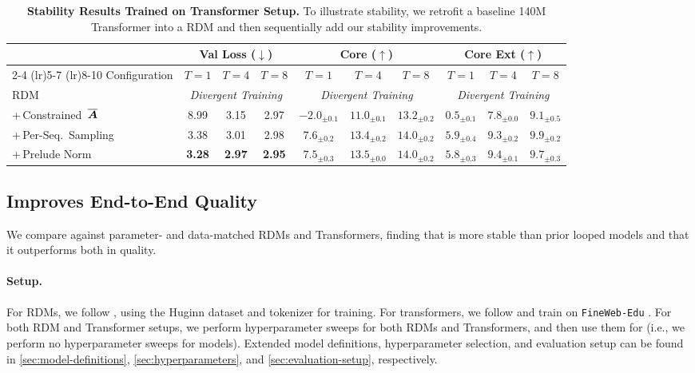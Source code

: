 \begin{table}[!t]
\centering
\small
\setlength{\tabcolsep}{4.5pt}
\begin{tabular}{l ccc ccc ccc}
\toprule
& \multicolumn{3}{c}{Val Loss ($\downarrow$)} & \multicolumn{3}{c}{Core ($\uparrow$)} & \multicolumn{3}{c}{Core Ext ($\uparrow$)} \\
\cmidrule(lr){2-4} \cmidrule(lr){5-7} \cmidrule(lr){8-10}
Configuration & $T\!=\!1$ & $T\!=\!4$ & $T\!=\!8$ & $T\!=\!1$ & $T\!=\!4$ & $T\!=\!8$ & $T\!=\!1$ & $T\!=\!4$ & $T\!=\!8$ \\
\midrule
RDM          & \multicolumn{3}{c}{\textit{Divergent Training}} & \multicolumn{3}{c}{\textit{Divergent Training}} & \multicolumn{3}{c}{\textit{Divergent Training}}\\
+\,Constrained\ $\overline{\bm{A}}$       & 8.99 & 3.15 & 2.97 & $-2.0_{\pm0.1}$ & $11.0_{\pm0.1}$ & $13.2_{\pm0.2}$ & $0.5_{\pm0.1}$ & $7.8_{\pm0.0}$ & $9.1_{\pm0.5}$ \\
+\,Per-Seq.\ Sampling & 3.38 & 3.01 & 2.98 & $\mathbf{7.6_{\pm0.2}}$ & $13.4_{\pm0.2}$ & $14.0_{\pm0.2}$ & $\mathbf{5.9_{\pm0.4}}$ & $9.3_{\pm0.2}$ & $\mathbf{9.9_{\pm0.2}}$ \\
+\,Prelude Norm       & \textbf{3.28} & \textbf{2.97} & \textbf{2.95} & $7.5_{\pm0.3}$ & $\mathbf{13.5_{\pm0.0}}$ & $\mathbf{14.0_{\pm0.2}}$ & $5.8_{\pm0.3}$ & $\mathbf{9.4_{\pm0.1}}$ & $9.7_{\pm0.3}$ \\
\bottomrule
\end{tabular}
\caption{\textbf{Stability Results Trained on Transformer Setup.} To illustrate stability, we retrofit a baseline 140M Transformer into a RDM and then sequentially add our stability improvements.}
\label{tab:ablation}
\end{table}



\subsection{\sysname Improves End-to-End Quality}
\label{sec:e2e}

We compare \sysname against parameter- and data-matched RDMs and Transformers, finding that \sysname is more stable than prior looped models and that it outperforms both in quality. 

\paragraph{Setup.} 
For RDMs, we follow \citet{geiping_scaling_2025}, using the Huginn dataset and tokenizer for training. For transformers, we follow \citet{nanochat} and train on \texttt{FineWeb-Edu} \citep{penedo2024finewebdatasetsdecantingweb}.
For both RDM and Transformer setups, we perform hyperparameter sweeps for both RDMs and Transformers, and then use them for \sysname (i.e., we perform no hyperparameter sweeps for \sysname models). Extended model definitions, hyperparameter selection, and evaluation setup can be found in \cref{sec:model-definitions}, \cref{sec:hyperparameters}, and \cref{sec:evaluation-setup}, respectively. 

